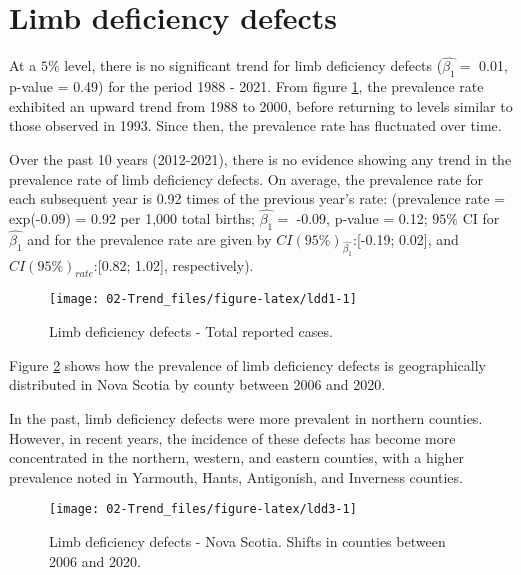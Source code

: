 \documentclass[
]{krantz}
\begin{document}
\clearpage

\hypertarget{section311}{%
\section{Limb deficiency defects}\label{section311}}

At a \(5\%\) level, there is no significant trend for limb deficiency defects (\(\hat{\beta_{1}} =\) 0.01, p-value = 0.49) for the period 1988 - 2021. From figure \ref{fig:ldd1}, the prevalence rate exhibited an upward trend from 1988 to 2000, before returning to levels similar to those observed in 1993. Since then, the prevalence rate has fluctuated over time.

Over the past 10 years (2012-2021), there is no evidence showing any trend in the prevalence rate of limb deficiency defects. On average, the prevalence rate for each subsequent year is 0.92 times of the previous year's rate: (prevalence rate = exp(-0.09) = 0.92 per 1,000 total births; \(\hat{\beta_{1}} =\) -0.09, p-value = 0.12; \(95\%\) CI for \(\hat{\beta_{1}}\) and for the prevalence rate are given by \(CI(95\%)_{\hat{\beta_{1}}}\):{[}-0.19; 0.02{]}, and \(CI(95\%)_{rate}\):{[}0.82; 1.02{]}, respectively).

\begin{figure}[h]

{\centering \texttt{[image: 02-Trend\_files/figure-latex/ldd1-1]} 

}

\caption{Limb deficiency defects - Total reported cases.}\label{fig:ldd1}
\end{figure}

Figure \ref{fig:ldd3} shows how the prevalence of limb deficiency defects is geographically distributed in Nova Scotia by county between 2006 and 2020.

In the past, limb deficiency defects were more prevalent in northern counties. However, in recent years, the incidence of these defects has become more concentrated in the northern, western, and eastern counties, with a higher prevalence noted in Yarmouth, Hants, Antigonish, and Inverness counties.

\begin{figure}[h]

{\centering \texttt{[image: 02-Trend\_files/figure-latex/ldd3-1]} 

}

\caption{Limb deficiency defects - Nova Scotia. Shifts in counties between 2006 and 2020.}\label{fig:ldd3}
\end{figure}
\end{document}
